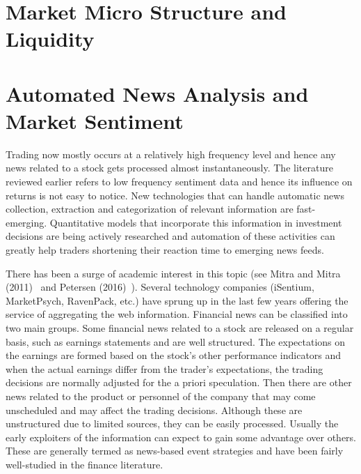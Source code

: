 \section{Market Micro Structure and Liquidity}
\section{Automated News Analysis and Market Sentiment}


Trading now mostly occurs at a relatively high frequency level and hence any news related to a stock gets processed almost instantaneously. The literature reviewed earlier refers to low frequency sentiment data and hence its influence on returns is not easy to notice. New technologies that can handle automatic news collection, extraction and categorization of relevant information are fast-emerging. Quantitative models that incorporate this information in investment decisions are being actively researched and automation of these activities can greatly help traders shortening their reaction time to emerging news feeds.


There has been a surge of academic interest in this topic (see Mitra and Mitra (2011)~\cite{mitra2} and Petersen (2016)~\cite{peterson}). Several technology companies (iSentium, MarketPsych, RavenPack, etc.) have sprung up in the last few years offering the service of aggregating the web information. Financial news can be classified into two main groups. Some financial news related to a stock are released on a regular basis, such as earnings statements and are well structured. The expectations on the earnings are formed based on the stock's other performance indicators and when the actual earnings differ from the trader's expectations, the trading decisions are normally adjusted for the a priori speculation. Then there are other news related to the product or personnel of the company that may come unscheduled and may affect the trading decisions. Although these are unstructured due to limited sources, they can be easily processed. Usually the early exploiters of the information can expect to gain some advantage over others. These are generally termed as news-based event strategies and have been fairly well-studied in the finance literature. 


